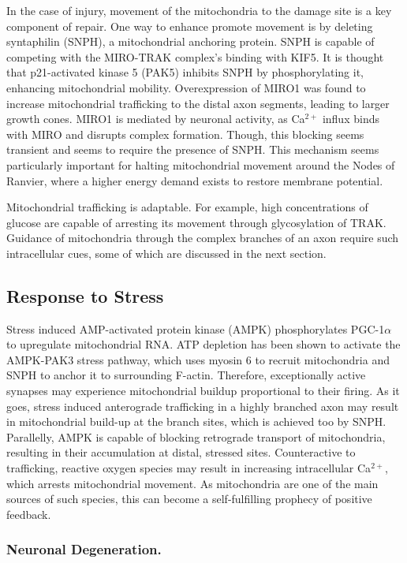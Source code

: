 In the case of injury, movement of the mitochondria to the damage site is a key component of repair. One way to enhance promote movement is by deleting syntaphilin (SNPH), a mitochondrial anchoring protein. SNPH is capable of competing with the MIRO-TRAK complex's binding with KIF5. It is thought that p21-activated kinase 5 (PAK5) inhibits SNPH by phosphorylating it, enhancing mitochondrial mobility. Overexpression of MIRO1 was found to increase mitochondrial trafficking to the distal axon segments, leading to larger growth cones. MIRO1 is mediated by neuronal activity, as Ca$^{2+}$ influx binds with MIRO and disrupts complex formation. Though, this blocking seems transient and seems to require the presence of SNPH. This mechanism seems particularly important for halting mitochondrial movement around the Nodes of Ranvier, where a higher energy demand exists to restore membrane potential.\newline

Mitochondrial trafficking is adaptable. For example, high concentrations of glucose are capable of arresting its movement through glycosylation of TRAK. Guidance of mitochondria through the complex branches of an axon require such intracellular cues, some of which are discussed in the next section.  

\subsection{Response to Stress}

Stress induced AMP-activated protein kinase (AMPK) phosphorylates PGC-1$\alpha$ to upregulate mitochondrial RNA. ATP depletion has been shown to activate the AMPK-PAK3 stress pathway, which uses myosin 6 to recruit mitochondria and SNPH to anchor it to surrounding F-actin. Therefore, exceptionally active synapses may experience mitochondrial buildup proportional to their firing. As it goes, stress induced anterograde trafficking in a highly branched axon may result in mitochondrial build-up at the branch sites, which is achieved too by SNPH. Parallelly, AMPK is capable of blocking retrograde transport of mitochondria, resulting in their accumulation at distal, stressed sites. Counteractive to trafficking, reactive oxygen species may result in increasing intracellular Ca$^{2+}$, which arrests mitochondrial movement. As mitochondria are one of the main sources of such species, this can become a self-fulfilling prophecy of positive feedback.

\subsubsection{Neuronal Degeneration.}

